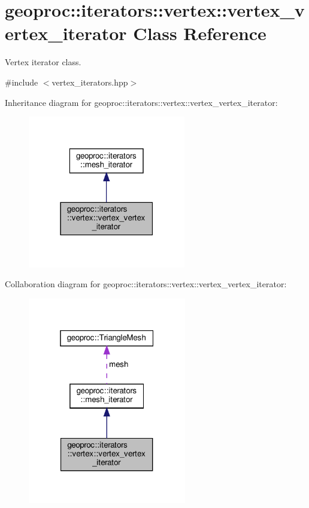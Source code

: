 \hypertarget{classgeoproc_1_1iterators_1_1vertex_1_1vertex__vertex__iterator}{}\section{geoproc\+:\+:iterators\+:\+:vertex\+:\+:vertex\+\_\+vertex\+\_\+iterator Class Reference}
\label{classgeoproc_1_1iterators_1_1vertex_1_1vertex__vertex__iterator}


Vertex iterator class.  




{\ttfamily \#include $<$vertex\+\_\+iterators.\+hpp$>$}



Inheritance diagram for geoproc\+:\+:iterators\+:\+:vertex\+:\+:vertex\+\_\+vertex\+\_\+iterator\+:\nopagebreak
\begin{figure}[H]
\begin{center}
\leavevmode
\includegraphics[width=195pt]{classgeoproc_1_1iterators_1_1vertex_1_1vertex__vertex__iterator__inherit__graph}
\end{center}
\end{figure}


Collaboration diagram for geoproc\+:\+:iterators\+:\+:vertex\+:\+:vertex\+\_\+vertex\+\_\+iterator\+:\nopagebreak
\begin{figure}[H]
\begin{center}
\leavevmode
\includegraphics[width=196pt]{classgeoproc_1_1iterators_1_1vertex_1_1vertex__vertex__iterator__coll__graph}
\end{center}
\end{figure}
